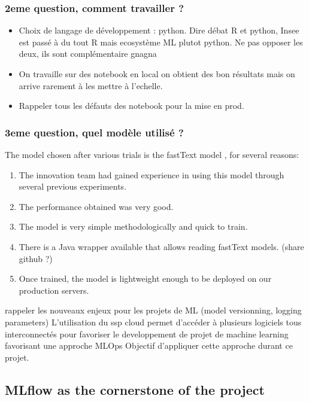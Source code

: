 \subsubsection{2eme question, comment travailler ?}
\begin{itemize}
    \item Choix de langage de développement : python. Dire débat R et python, Insee est passé à du tout R mais ecosystème ML plutot python. Ne pas opposer les deux, ils sont complémentaire gnagna
    \item On travaille sur des notebook en local on obtient des bon résultats mais on arrive rarement à les mettre à l'echelle. 
    \item Rappeler tous les défauts des notebook pour la mise en prod. 
\end{itemize}


\subsubsection{3eme question, quel modèle utilisé ?}

The model chosen after various trials is the fastText model \cite{joulin2016bag}, for several reasons:

\begin{enumerate}
    \item The innovation team had gained experience in using this model through several previous experiments.
    \item The performance obtained was very good.
    \item The model is very simple methodologically and quick to train.
    \item There is a Java wrapper available that allows reading fastText models. (share github ?)
    \item Once trained, the model is lightweight enough to be deployed on our production servers.
\end{enumerate}


rappeler les nouveaux enjeux pour les projets de ML (model versionning, logging parameters) 
L'utilisation du ssp cloud permet d'accéder à plusieurs logiciels tous interconnectés pour favoriser le developpement de projet de machine learning favorisant une approche MLOps
Objectif d'appliquer cette approche durant ce projet.

\subsection{MLflow as the cornerstone of the project}

